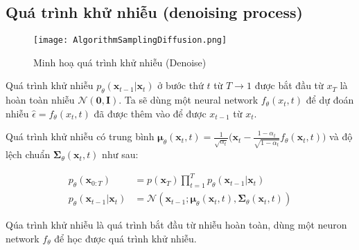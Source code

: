 \subsection{Quá trình khử nhiễu (denoising process)}
\label{subsection:denoising_process}

\setcounter{figure}{6}
\begin{figure}[]
	\centering
	\texttt{[image: AlgorithmSamplingDiffusion.png]}
	\caption{Minh hoạ quá trình khử nhiễu (Denoise)}
	\label{fig:AlgorithmSamplingDiffusion}
	\vspace{-20pt}
\end{figure}

Quá trình khử nhiễu $p_\theta(\mathbf{x}_{t-1} \vert \mathbf{x}_t)$  ở bước thứ $t$ từ $T \to 1$ được bắt đầu từ $x_T$ là hoàn toàn nhiễu $\mathcal{N} (\mathbf{0}, \mathbf{I})$. Ta sẽ dùng một neural network $f_{\theta} (x_t, t)$ để dự đoán nhiễu $\hat{\epsilon} = f_{\theta}(x_t, t)$ đã được thêm vào để được $x_{t-1}$ từ $x_t$.

Quá trình khử nhiễu có trung bình $\boldsymbol{\mu}_\theta(\mathbf{x}_t, t) = {\frac{1}{\sqrt{\alpha_t}} \Big( \mathbf{x}_t - \frac{1 - \alpha_t}{\sqrt{1 - \bar{\alpha}_t}}  f_\theta(\mathbf{x}_t, t) \Big)}$ và độ lệch chuẩn $\boldsymbol{\Sigma}_\theta(\mathbf{x}_t, t)$ như sau:




\begin{equation}
	\label{eq:denoising_process}
	\begin{aligned}
		p_\theta(\mathbf{x}_{0:T})
		&= p(\mathbf{x}_T) \prod^T_{t=1} p_\theta(\mathbf{x}_{t-1} \vert \mathbf{x}_t) \\
		p_\theta(\mathbf{x}_{t-1} \vert \mathbf{x}_t) &= \mathcal{N}(\mathbf{x}_{t-1};  \boldsymbol{\mu}_\theta(\mathbf{x}_t, t), \boldsymbol{\Sigma}_\theta(\mathbf{x}_t, t))
	\end{aligned}
\end{equation}

Qúa trình khử nhiễu là quá trình bắt đầu từ nhiễu hoàn toàn, dùng một neuron network $f_\theta$ để học được quá trình khử nhiễu.



